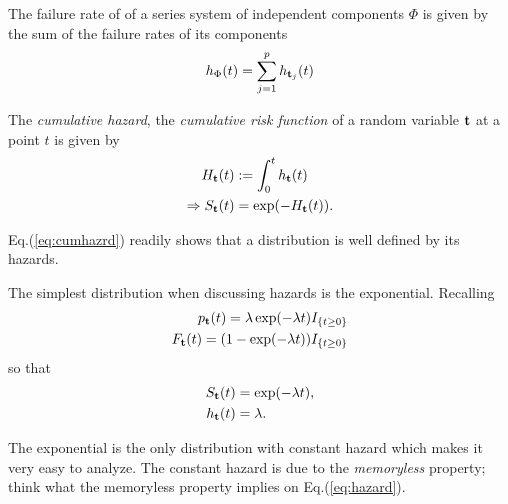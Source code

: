 \begin{theorem}
The failure rate of of a series system of independent components $\Phi$ is given by the sum of the failure rates of its components
\begin{align}
	h_{\Phi} (t)= \sum_{j=1}^{p} h_{\mathbf{t}_j} (t)
\end{align}
\end{theorem}




\begin{definition}
The \emph{cumulative hazard}, \aka the \emph{cumulative risk function} of a random variable $\mathbf{t}$ at a point $t$ is given by 
\begin{align}
	H_{\mathbf{t}} (t) &:= \int_{0}^{t}h_{\mathbf{t}} (t) \\
	\Rightarrow S_{\mathbf{t}} (t) &= \exp(-H_{\mathbf{t}} (t)). \label{eq:cumhazrd}
\end{align}
\end{definition}
Eq.(\ref{eq:cumhazrd}) readily shows that a distribution is well defined by its hazards.





\begin{example}
The simplest distribution when discussing hazards is the exponential.
Recalling
\begin{align}
	p_{\mathbf{t}} (t)= \lambda \exp(-\lambda t) I_{\{ t \geq 0 \}} \\
	F_{\mathbf{t}} (t)= (1-\exp(-\lambda t)) I_{\{ t \geq 0 \}}
\end{align}
so that 
\begin{align}
	S_{\mathbf{t}} (t) &= \exp(-\lambda t), \\
	h_{\mathbf{t}} (t) &= \lambda.
\end{align}
\end{example}
The exponential is the only distribution with constant hazard which makes it very easy to analyze.
The constant hazard is due to the \emph{memoryless} property; think what the memoryless property implies on Eq.(\ref{eq:hazard}).


